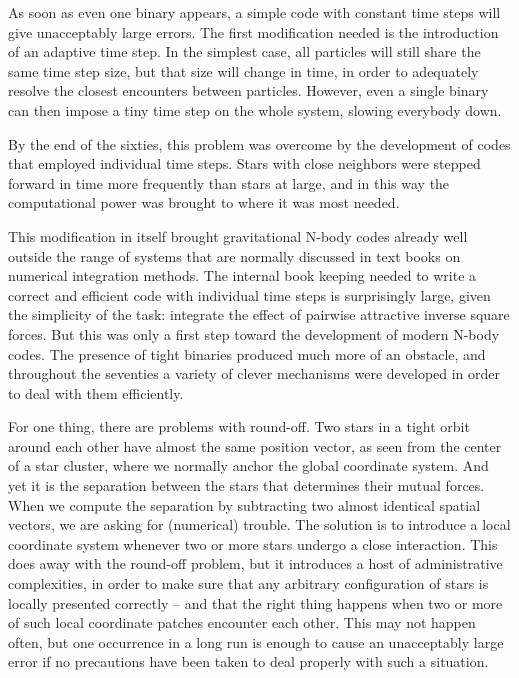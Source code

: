 \documentclass{book}
\begin{document}
As soon as even one binary appears, a simple code with constant time
steps will give unacceptably large errors.  The first modification
needed is the introduction of an adaptive time step.  In the simplest
case, all particles will still share the same time step size, but that
size will change in time, in order to adequately resolve the closest
encounters between particles.  However, even a single binary can then
impose a tiny time step on the whole system, slowing everybody down.

By the end of the sixties, this problem was overcome by the
development of codes that employed individual time steps.  Stars with
close neighbors were stepped forward in time more frequently than
stars at large, and in this way the computational power was brought to
where it was most needed.

This modification in itself brought gravitational N-body codes already
well outside the range of systems that are normally discussed in text
books on numerical integration methods.  The internal book keeping
needed to write a correct and efficient code with individual time
steps is surprisingly large, given the simplicity of the task:
integrate the effect of pairwise attractive inverse square forces.
But this was only a first step toward the development of modern N-body
codes.  The presence of tight binaries produced much more of an obstacle,
and throughout the seventies a variety of clever mechanisms were developed
in order to deal with them efficiently.

For one thing, there are problems with round-off.  Two stars in a
tight orbit around each other have almost the same position vector, as
seen from the center of a star cluster, where we normally anchor the
global coordinate system.  And yet it is the separation between the
stars that determines their mutual forces.  When we compute the
separation by subtracting two almost identical spatial vectors, we are
asking for (numerical) trouble.  The solution is to introduce a local
coordinate system whenever two or more stars undergo a close
interaction.  This does away with the round-off problem, but it
introduces a host of administrative complexities, in order to make
sure that any arbitrary configuration of stars is locally presented
correctly -- and that the right thing happens when two or more of such
local coordinate patches encounter each other.  This may not happen
often, but one occurrence in a long run is enough to cause an
unacceptably large error if no precautions have been taken to deal
properly with such a situation.
\end{document}
